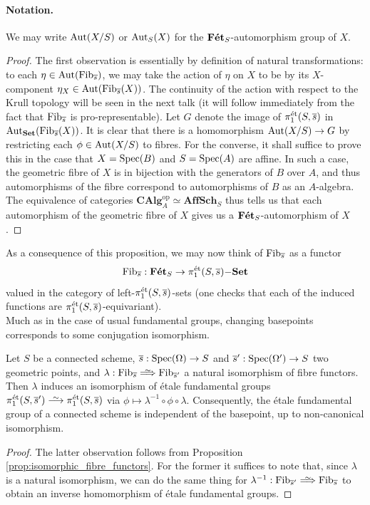 \paragraph{Notation.} We may write $\mathrm{Aut}(X/S)$ or $\mathrm{Aut}_S(X)$ for the $\mathbf{F\acute{e}t}_S$-automorphism group of $X$.

\begin{proof}
	The first observation is essentially by definition of natural transformations: to each $\eta \in \mathrm{Aut}(\mathrm{Fib}_{\overline{s}})$, we may take the action of $\eta$ on $X$ to be by its $X$-component $\eta_X \in \mathrm{Aut}(\mathrm{Fib}_{\overline{s}}(X))$. The continuity of the action with respect to the Krull topology will be seen in the next talk (it will follow immediately from the fact that $\mathrm{Fib}_{\overline{s}}$ is pro-representable). Let $G$ denote the image of $\pi_1^{\mathrm{\acute{e}t}}(S, \overline{s})$ in $\mathrm{Aut}_{\mathbf{Set}}(\mathrm{Fib}_{\overline{s}}(X))$. It is clear that there is a homomorphism $\mathrm{Aut}(X/S) \to G$ by restricting each $\phi \in \mathrm{Aut}(X/S)$ to fibres. For the converse, it shall suffice to prove this in the case that $X=\mathrm{Spec}(B)$ and $S=\mathrm{Spec}(A)$ are affine. In such a case, the geometric fibre of $X$ is in bijection with the generators of $B$ over $A$, and thus automorphisms of the fibre correspond to automorphisms of $B$ as an $A$-algebra. The equivalence of categories $\mathbf{CAlg}_A^\text{op} \simeq \mathbf{AffSch}_S$ thus tells us that each automorphism of the geometric fibre of $X$ gives us a $\mathbf{F\acute{e}t}_S$-automorphism of $X$.
\end{proof}

As a consequence of this proposition, we may now think of $\mathrm{Fib}_{\overline{s}}$ as a functor 
\[
	\mathrm{Fib}_{\overline{s}} : \mathbf{F\acute{e}t}_S \to \pi_1^{\mathrm{\acute{e}t}}(S, \overline{s})\mathbf{-Set}
\]
valued in the category of left-$\pi_1^{\mathrm{\acute{e}t}}(S, \overline{s})$-sets (one checks that each of the induced functions are $\pi_1^{\mathrm{\acute{e}t}}(S, \overline{s})$-equivariant).\\

Much as in the case of usual fundamental groups, changing basepoints corresponds to some conjugation isomorphism.
\begin{prop}
	\label{prop:change_of_basepoint}
	Let $S$ be a connected scheme, $\overline{s}:\mathrm{Spec}(\Omega) \to S$ and $\overline{s}' : \mathrm{Spec}(\Omega') \to S$ two geometric points, and $\lambda : \Fib_{\ol{s}} \ISO \Fib_{\ol{s}'}$ a natural isomorphism of fibre functors. Then $\lambda$ induces an isomorphism of \'etale fundamental groups $\pi_1^{\et}(S, \ol{s}') \iso \pi_1^{\et}(S, \ol{s})$ via $\phi \mapsto \lambda^{-1} \circ \phi \circ \lambda$. Consequently, the \'etale fundamental group of a connected scheme is independent of the basepoint, up to non-canonical isomorphism.
\end{prop}
\begin{proof}
	The latter observation follows from Proposition \ref{prop:isomorphic_fibre_functors}. For the former it suffices to note that, since $\lambda$ is a natural isomorphism, we can do the same thing for $\lambda^{-1} : \Fib_{\ol{s}'} \ISO \Fib_{\ol{s}}$ to obtain an inverse homomorphism of \'etale fundamental groups.
\end{proof}

